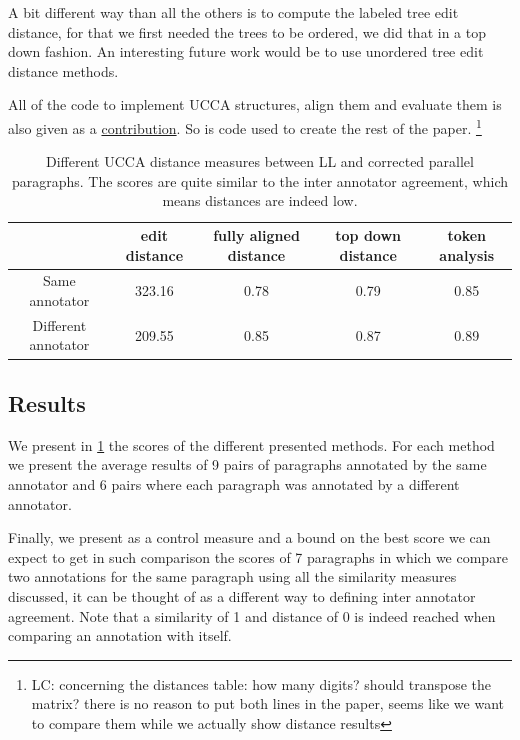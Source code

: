 \documentclass[english]{article}
\newcommand{\lc}[1]{\footnote{\color{green}LC: #1}}
\begin{document}
A bit different way than all the others is to compute the labeled
tree edit distance\cite{zhang1989simple}, for that we first needed
the trees to be ordered, we did that in a top down fashion. An interesting
future work would be to use unordered tree edit distance methods\cite{zhang1992editing}.

All of the code to implement UCCA structures, align them and evaluate
them is also given as a \href{link will be disclosed upon publication}{contribution}.
So is code used to create the rest of the paper.
\lc{concerning the distances table: how many digits? should transpose the matrix? there is no reason to put both lines in the paper, seems like we want to compare them while we actually show distance results}

\begin{table}[h!]
	\centering
	\label{tab:Distances}
	\begin{tabular}{c|c|c|c|c}
		& edit distance & fully aligned distance & top down distance & token analysis
		\\
		\hline
		Same annotator & 323.16 & 0.78 & 0.79 & 0.85
		\\
		Different annotator & 209.55 & 0.85 & 0.87 & 0.89
		\\
		\end{tabular}
		\caption{Different UCCA distance measures between LL and corrected parallel paragraphs. The scores are quite similar to the inter annotator agreement, which means distances are indeed low.}
	\end{table}
		
	\subsection{Results}
	
	We present in \ref{tab:Distances} the scores of the different presented
	methods. For each method we present the average results of 9 pairs
	of paragraphs annotated by the same annotator and 6 pairs where each
	paragraph was annotated by a different annotator.
	
	Finally, we present as a control measure and a bound on the best score
	we can expect to get in such comparison the scores of 7 paragraphs
	in which we compare two annotations for the same paragraph using all
	the similarity measures discussed, it can be thought of as a different
	way to defining inter annotator agreement. Note that a similarity
	of 1 and distance of 0 is indeed reached when comparing an annotation with itself.
	
\end{document}
